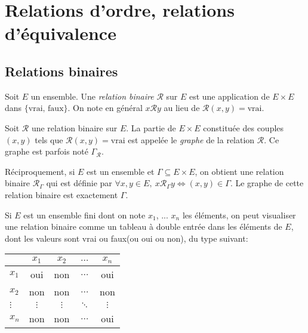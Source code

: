 \chapter{Relations d'ordre, relations d'équivalence}
\minitoc
\hyperlink{toc}{\retourTOC}

\section{Relations binaires}

\begin{definition}
Soit $E$ un ensemble. Une \emph{relation binaire} ${\mathcal R}$ sur $E$ est une application de $E\times E$ dans $\{\text{vrai, faux}\}$. On note en général \og$x{\mathcal R}y$\fg{} au lieu de \og${\mathcal R}(x,y)=\text{vrai}$\fg{}.
\end{definition}

\begin{definition}
Soit $\mathcal R$ une relation binaire sur $E$. La partie de $E\times E$ constituée des couples $(x,y)$ tels que ${\mathcal R}(x,y)=\text{vrai}$ est appelée le \emph{graphe} de la relation $\mathcal R$. Ce graphe est parfois noté $\Gamma_{\mathcal R}$.

Réciproquement, si $E$ est un ensemble et $\Gamma \subseteq E\times E$, on obtient une relation binaire ${\mathcal R}_\Gamma$ qui est définie par $\forall x, y\in E, \: x{\mathcal R}_\Gamma y \iff (x,y)\in \Gamma$. Le graphe de cette relation binaire est exactement $\Gamma$.
\end{definition}






Si $E$ est un ensemble fini dont on note $x_1$, ... $x_n$ les éléments, on peut visualiser une relation binaire comme un tableau à double entrée dans les éléments de $E$, dont les valeurs sont \og vrai\fg{} ou \og faux\fg (ou \og oui\fg{} ou \og non\fg), du type suivant:

\begin{center}
\begin{tabular}{|l|c|c|c|c|}\hline
		& $x_1$ & $x_2$ & $\dots$ & $x_n$ \\ \hline
$x_1$ 	& oui & non & $\dots$ & oui \\ \hline
$x_2$ 	& non & non & $\dots$ & non \\ \hline
$\vdots$& $\vdots$ & $\vdots$ &  $\ddots$ & $\vdots$ \\ \hline
$x_n$	& non & non & $\dots$ & oui \\ \hline
\end{tabular}
\end{center}

